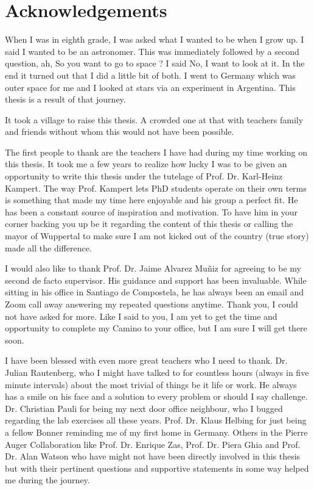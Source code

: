 \chapter*{Acknowledgements}
\label{sec:ack}
When I was in eighth grade, I was asked what I wanted to be when I grow up. I said I wanted to be an astronomer. This was immediately followed by a second question, ah, So you want to go to space ? I said No, I want to look at it. In the end it turned out that I did a little bit of both. I went to Germany which was outer space for me and I looked at stars via an experiment in Argentina. This thesis is a result of that journey.

It took a village to raise this thesis. A crowded one at that with teachers family and friends without whom this would not have been possible.

The first people to thank are the teachers I have had during my time working on this thesis. It took me a few years to realize how lucky I was to be given an opportunity to write this thesis under the tutelage of Prof. Dr. Karl-Heinz Kampert. The way Prof. Kampert lets PhD students operate on their own terms is something that made my time here enjoyable and his group a perfect fit. He has been a constant source of inspiration and motivation. To have him in your corner backing you up be it regarding the content of this thesis or calling the mayor of Wuppertal to make sure I am not kicked out of the country (true story) made all the difference. 

I would also like to thank Prof. Dr. Jaime Alvarez Muñiz for agreeing to be my second de facto supervisor. His guidance and support has been invaluable. While sitting in his office in Santiago de Compostela, he has always been an email and Zoom call away answering my repeated questions anytime. Thank you, I could not have asked for more. Like I said to you, I am yet to get the time and opportunity to complete my Camino to your office, but I am sure I will get there soon. 

I have been blessed with even more great teachers who I need to thank. Dr. Julian Rautenberg, who I might have talked to for countless hours (always in five minute intervals) about the most trivial of things be it life or work. He always has a smile on his face and a solution to every problem or should I say challenge. Dr. Christian Pauli for being my next door office neighbour, who I bugged regarding the lab exercises all these years. Prof. Dr. Klaus Helbing for just being a fellow Bonner reminding me of my first home in Germany. Others in the Pierre Auger Collaboration like Prof. Dr. Enrique Zas, Prof. Dr. Piera Ghia and Prof. Dr. Alan Watson who have might not have been directly involved in this thesis but with their pertinent questions and supportive statements in some way helped me during the journey.

